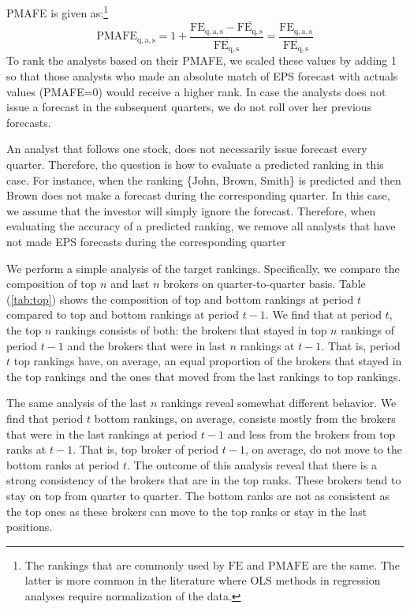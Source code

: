 PMAFE is given as:\footnote{The rankings that are commonly used by $\mathrm{FE}$ and $\mathrm{PMAFE}$ are the same. The latter is more common in the literature where OLS methods in regression analyses require normalization of the data.}
\begin{equation}
\mathrm{PMAFE_{q,a,s}}=1+\frac{\mathrm{FE_{q,a,s}}-\mathrm{\overline{FE_{q,s}}}}{\mathrm{\overline{FE_{q,s}}}}=\frac{\mathrm{FE_{q,a,s}}}{\mathrm{\overline{FE_{q,s}}}}
\end{equation}
To rank the analysts based on their PMAFE, we scaled these values by adding 1 so that those analysts who made an absolute match of EPS forecast with actuals values (PMAFE=0) would receive a higher rank. In case the analysts does not issue a forecast in the subsequent quarters, we do not roll over her previous forecasts. 

An analyst that follows one stock, does not necessarily issue forecast every quarter. Therefore, the question is how to evaluate a predicted ranking in this case. For instance, when the ranking \{John, Brown, Smith\} is predicted and then Brown does not make a forecast during the corresponding quarter. In this case, we assume that the investor will simply ignore the forecast. Therefore, when evaluating the accuracy of a predicted ranking, we remove all analysts that have not made EPS forecasts during the corresponding quarter

We perform a simple analysis of the target rankings. Specifically, we compare the composition of top $n$ and last $n$ brokers on quarter-to-quarter basis. Table (\ref{tab:top}) shows the composition of top and bottom rankings at period $t$ 
compared to top and bottom rankings at period $t-1$.  We find that at period $t$, the top $n$ rankings consists of both: the  brokers that stayed in top $n$ rankings of period $t-1$  and the brokers that were in last $n$ rankings at $t-1$. That is, period $t$ top rankings have, on average, an equal proportion of the brokers that stayed in the top rankings and the ones that moved from the last rankings to top rankings.

The same analysis of the last $n$ rankings reveal somewhat different behavior. We find that period $t$ bottom rankings,  on average, consists mostly from the brokers that were in the last rankings at period $t-1$ and less from the brokers from top ranks at $t-1$. That is, top broker of period $t-1$, on average, do not move to the bottom ranks at period $t$. The outcome of this analysis reveal that there is a strong consistency of the brokers that are in the top ranks. These brokers tend to stay on top from quarter to quarter. The bottom ranks are not as consistent as the top ones as these brokers can move to the top ranks or stay in the last positions. 



